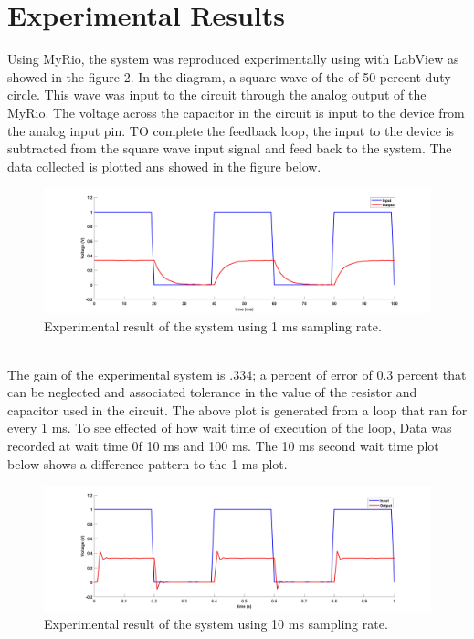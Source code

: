 \documentclass[12pt,letterpaper]{article}
\begin{document}
\section*{Experimental Results}
Using MyRio, the system was reproduced experimentally using with LabView as showed
in the figure 2. In the diagram, a square wave of the  of 50 percent duty circle.
This wave was input to the circuit through the analog output of the MyRio. The 
voltage across the capacitor in the circuit is input to the device from the analog input
pin. TO complete the feedback loop, the input to the device is subtracted from the 
square wave input signal and feed back to the system. The data collected is plotted ans showed
in the figure below.\\
\begin{figure}[h]
    \centering
    \includegraphics[width=15cm]{expstepin.jpg}
    \caption{Experimental result of the system using 1 ms sampling rate.}
\end{figure}\\
The gain of the experimental system is .334; a percent of error of
0.3 percent that can be neglected and associated tolerance
in the value of the resistor and capacitor used in the circuit. The 
above plot is generated from a loop that ran for every 1 ms.
To see effected of how wait time of execution of the loop,
Data was recorded at wait time 0f 10 ms and 100 ms. The 10 ms second
wait time plot below shows a difference pattern to the 1 ms plot.\\
\begin{figure}[h]
    \centering
    \includegraphics[width=15cm]{expstepin10.jpg}
    \caption{Experimental result of the system using 10 ms sampling rate.}
\end{figure}\\
\end{document}

